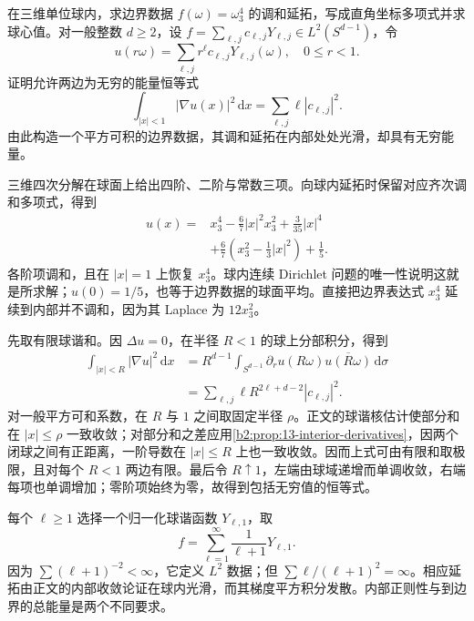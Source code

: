\begin{exercise}\label{b2:ex:B2-ball-quartic}
在三维单位球内，求边界数据 \(f(\omega)=\omega_3^4\) 的调和延拓，写成直角坐标多项式并求球心值。对一般整数 \(d\ge2\)，设 \(f=\sum_{\ell,j}c_{\ell,j}Y_{\ell,j}\in L^2(S^{d-1})\)，令
\[
 u(r\omega)=\sum_{\ell,j}r^\ell c_{\ell,j}Y_{\ell,j}(\omega),
 \quad 0\le r<1.
\]
证明允许两边为无穷的能量恒等式
\[
 \int_{|x|<1}|\nabla u(x)|^2\,\mathrm dx
 =\sum_{\ell,j}\ell|c_{\ell,j}|^2.
\]
由此构造一个平方可积的边界数据，其调和延拓在内部处处光滑，却具有无穷能量。
\end{exercise}
\begin{solution}
三维四次分解在球面上给出四阶、二阶与常数三项。向球内延拓时保留对应齐次调和多项式，得到
\[
 \begin{aligned}
 u(x)={}&x_3^4-\frac67|x|^2x_3^2+\frac3{35}|x|^4\\
       &+\frac67\left(x_3^2-\frac13|x|^2\right)+\frac15.
 \end{aligned}
\]
各阶项调和，且在 \(|x|=1\) 上恢复 \(x_3^4\)。球内连续 Dirichlet 问题的唯一性说明这就是所求解；\(u(0)=1/5\)，也等于边界数据的球面平均。直接把边界表达式 \(x_3^4\) 延续到内部并不调和，因为其 Laplace 为 \(12x_3^2\)。

先取有限球谐和。因 \(\Delta u=0\)，在半径 \(R<1\) 的球上分部积分，得到
\[
 \begin{aligned}
 \int_{|x|<R}|\nabla u|^2\,\mathrm dx
 &=R^{d-1}\int_{S^{d-1}}\partial_ru(R\omega)
                         \overline{u(R\omega)}\,\mathrm d\sigma\\
 &=\sum_{\ell,j}\ell R^{2\ell+d-2}|c_{\ell,j}|^2.
 \end{aligned}
\]
对一般平方可和系数，在 \(R\) 与 \(1\) 之间取固定半径 \(\rho\)。正文的球谐核估计使部分和在 \(|x|\le\rho\) 一致收敛；对部分和之差应用\cref{b2:prop:13-interior-derivatives}，因两个闭球之间有正距离，一阶导数在 \(|x|\le R\) 上也一致收敛。因而上式可由有限和取极限，且对每个 \(R<1\) 两边有限。最后令 \(R\uparrow1\)，左端由球域递增而单调收敛，右端每项也单调增加；零阶项始终为零，故得到包括无穷值的恒等式。

每个 \(\ell\ge1\) 选择一个归一化球谐函数 \(Y_{\ell,1}\)，取
\[
 f=\sum_{\ell=1}^\infty\frac1{\ell+1}Y_{\ell,1}.
\]
因为 \(\sum(\ell+1)^{-2}<\infty\)，它定义 \(L^2\) 数据；但 \(\sum\ell/(\ell+1)^2=\infty\)。相应延拓由正文的内部收敛论证在球内光滑，而其梯度平方积分发散。内部正则性与到边界的总能量是两个不同要求。
\end{solution}

